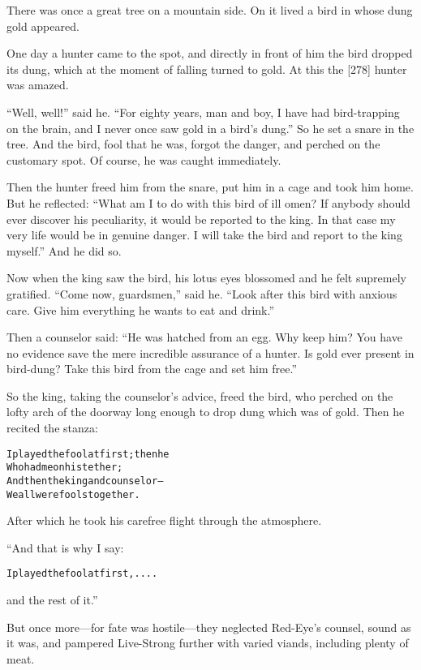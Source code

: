 \documentclass{article}
\renewenvironment{verbatim}{\begin{alltt}\normalfont\begin{centering}}{\end{centering}\end{alltt}}
\begin{document}
There was once a great tree on a mountain side. On it lived a bird
in whose dung gold appeared.

One day a hunter came to the spot, and directly in front of him the
bird dropped its dung, which at the moment of falling turned to
gold. At this the [278] hunter was amazed.

``Well, well!'' said he.
``For eighty years, man and boy, I have had bird-trapping on the brain, and I never once saw gold in a bird's dung.''
So he set a snare in the tree. And the bird, fool that he was,
forgot the danger, and perched on the customary spot. Of course, he
was caught immediately.

Then the hunter freed him from the snare, put him in a cage and
took him home. But he reflected:
``What am I to do with this bird of ill omen? If anybody should ever discover his peculiarity, it would be reported to the king. In that case my very life would be in genuine danger. I will take the bird and report to the king myself.''
And he did so.

Now when the king saw the bird, his lotus eyes blossomed and he
felt supremely gratified. ``Come now, guardsmen,'' said he.
``Look after this bird with anxious care. Give him everything he wants to eat and drink.''

Then a counselor said:
``He was hatched from an egg. Why keep him? You have no evidence save the mere incredible assurance of a hunter. Is gold ever present in bird-dung? Take this bird from the cage and set him free.''

So the king, taking the counselor's advice, freed the bird, who
perched on the lofty arch of the doorway long enough to drop dung
which was of gold. Then he recited the stanza:

\begin{verbatim}
I played the fool at first; then he
    Who had me on his tether;
And then the king and counselor--
    We all were fools together.
\end{verbatim}
After which he took his carefree flight through the atmosphere.

“And that is why I say:

\begin{verbatim}
I played the fool at first, ....
\end{verbatim}
and the rest of it.”

But once more---for fate was hostile---they neglected Red-Eye's
counsel, sound as it was, and pampered Live-Strong further with
varied viands, including plenty of meat.
\end{document}
